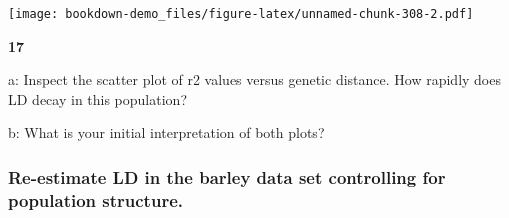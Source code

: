 \documentclass[
]{book}
\makeatletter
\newenvironment{kframe}{%
\medskip{}
\setlength{\fboxsep}{.8em}
 \def\at@end@of@kframe{}%
 \ifinner\ifhmode%
  \def\at@end@of@kframe{\end{minipage}}%
  \begin{minipage}{\columnwidth}%
 \fi\fi%
 \def\FrameCommand##1{\hskip\@totalleftmargin \hskip-\fboxsep
 \colorbox{shadecolor}{##1}\hskip-\fboxsep
     \hskip-\linewidth \hskip-\@totalleftmargin \hskip\columnwidth}%
 \MakeFramed {\advance\hsize-\width
   \@totalleftmargin\z@ \linewidth\hsize
   \@setminipage}}%
 {\par\unskip\endMakeFramed%
 \at@end@of@kframe}
\newenvironment{rmdblock}[1]
  {
  \begin{itemize}
  \renewcommand{\labelitemi}{
    \raisebox{-.7\height}[0pt][0pt]{
      {\setkeys{Gin}{width=3em,keepaspectratio}\texttt{[image: images/\#1]}}
    }
  }
  \setlength{\fboxsep}{1em}
  \begin{kframe}
  \item
  }
  {
  \end{kframe}
  \end{itemize}
  }
\newenvironment{rmdquiz}
  {\begin{rmdblock}{quiz}}
  {\end{rmdblock}}
\makeatother
\begin{document}
\texttt{[image: bookdown-demo\_files/figure-latex/unnamed-chunk-308-2.pdf]}

\begin{rmdquiz}
\textbf{17}

a: Inspect the scatter plot of r2 values versus genetic distance. How rapidly does LD decay in this population?

b: What is your initial interpretation of both plots?
\end{rmdquiz}

\hypertarget{re-estimate-ld-in-the-barley-data-set-controlling-for-population-structure.}{%
\subsubsection{Re-estimate LD in the barley data set controlling for population structure.}\label{re-estimate-ld-in-the-barley-data-set-controlling-for-population-structure.}}
\end{document}
